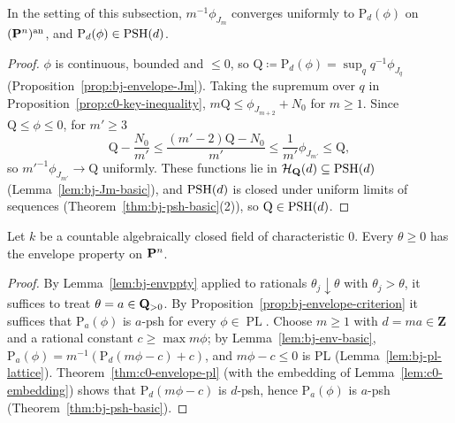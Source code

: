 \begin{theorem}\label{thm:c0-envelope-pl}
\leanok
{}
In the setting of this subsection, $m^{-1}\phi_{J_m}$ converges uniformly to $\mathrm P_d(\phi)$ on $(\mathbf{P}^n)^{\mathrm{an}}$, and $\mathrm P_d(\phi)\in\operatorname{PSH}(d)$.
\end{theorem}

\begin{proof}
$\phi$ is continuous, bounded and $\le0$, so $\mathrm Q\coloneqq\mathrm P_d(\phi)=\sup_qq^{-1}\phi_{J_q}$ (Proposition~\ref{prop:bj-envelope-Jm}). Taking the
supremum over $q$ in Proposition~\ref{prop:c0-key-inequality}, $m\mathrm Q\le\phi_{J_{m+2}}+N_0$ for $m\ge1$. Since $\mathrm Q\le\phi\le0$, for $m'\ge3$
\[
\mathrm Q-\frac{N_0}{m'}\le\frac{(m'-2)\mathrm Q-N_0}{m'}\le\frac1{m'}\phi_{J_{m'}}\le\mathrm Q,
\]
so $m'^{-1}\phi_{J_{m'}}\to\mathrm Q$ uniformly. These functions lie in $\mathcal H_{\mathbf{Q}}(d)\subseteq\operatorname{PSH}(d)$ (Lemma~\ref{lem:bj-Jm-basic}), and
$\operatorname{PSH}(d)$ is closed under uniform limits of sequences (Theorem~\ref{thm:bj-psh-basic}(2)), so $\mathrm Q\in\operatorname{PSH}(d)$.
\end{proof}

\begin{theorem}\label{thm:c0-pn-ep}
\leanok
{}
Let $k$ be a countable algebraically closed field of characteristic $0$. Every $\theta\ge0$ has the envelope property on $\mathbf{P}^n$.
\end{theorem}

\begin{proof}
By Lemma~\ref{lem:bj-envppty} applied to rationals $\theta_j\downarrow\theta$ with $\theta_j>\theta$, it suffices to treat $\theta=a\in\mathbf{Q}_{>0}$. By
Proposition~\ref{prop:bj-envelope-criterion} it suffices that $\mathrm P_a(\phi)$ is $a$-psh for every $\phi\in\operatorname{PL}$. Choose $m\ge1$ with
$d=ma\in\mathbf Z$ and a rational constant $c\ge\max m\phi$; by Lemma~\ref{lem:bj-env-basic},
$\mathrm P_a(\phi)=m^{-1}(\mathrm P_d(m\phi-c)+c)$, and $m\phi-c\le0$ is PL (Lemma~\ref{lem:bj-pl-lattice}). Theorem~\ref{thm:c0-envelope-pl} (with the embedding of
Lemma~\ref{lem:c0-embedding}) shows that $\mathrm P_d(m\phi-c)$ is $d$-psh, hence $\mathrm P_a(\phi)$ is $a$-psh (Theorem~\ref{thm:bj-psh-basic}).
\end{proof}

